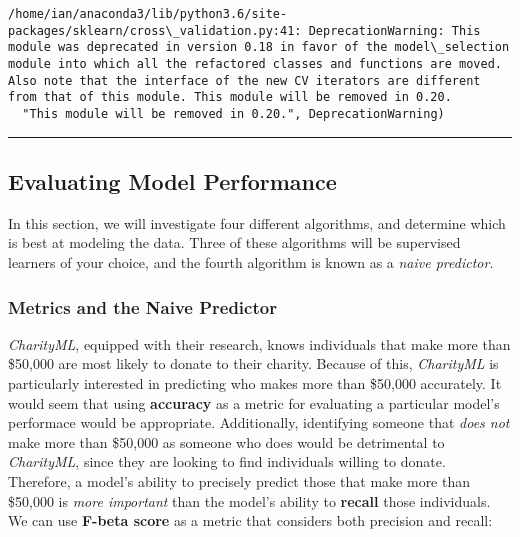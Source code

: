 \documentclass[11pt]{article}
\begin{document}
    \begin{Verbatim}[commandchars=\\\{\}]
/home/ian/anaconda3/lib/python3.6/site-packages/sklearn/cross\_validation.py:41: DeprecationWarning: This module was deprecated in version 0.18 in favor of the model\_selection module into which all the refactored classes and functions are moved. Also note that the interface of the new CV iterators are different from that of this module. This module will be removed in 0.20.
  "This module will be removed in 0.20.", DeprecationWarning)

    \end{Verbatim}

    \begin{center}\rule{0.5\linewidth}{\linethickness}\end{center}

\subsection{Evaluating Model
Performance}\label{evaluating-model-performance}

In this section, we will investigate four different algorithms, and
determine which is best at modeling the data. Three of these algorithms
will be supervised learners of your choice, and the fourth algorithm is
known as a \emph{naive predictor}.

    \subsubsection{Metrics and the Naive
Predictor}\label{metrics-and-the-naive-predictor}

\emph{CharityML}, equipped with their research, knows individuals that
make more than \$50,000 are most likely to donate to their charity.
Because of this, \emph{CharityML} is particularly interested in
predicting who makes more than \$50,000 accurately. It would seem that
using \textbf{accuracy} as a metric for evaluating a particular model's
performace would be appropriate. Additionally, identifying someone that
\emph{does not} make more than \$50,000 as someone who does would be
detrimental to \emph{CharityML}, since they are looking to find
individuals willing to donate. Therefore, a model's ability to precisely
predict those that make more than \$50,000 is \emph{more important} than
the model's ability to \textbf{recall} those individuals. We can use
\textbf{F-beta score} as a metric that considers both precision and
recall:
\end{document}
